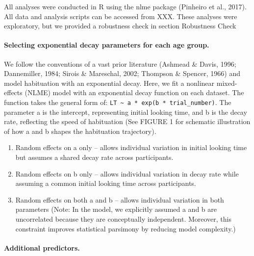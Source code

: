 \documentclass[10pt, letterpaper]{article}
\begin{document}
All analyses were conducted in R using the nlme package (Pinheiro et
al., 2017). All data and analysis scripts can be accessed from XXX.
These analyses were exploratory, but we provided a robustness check in
section Robustness Check

\hypertarget{selecting-exponential-decay-parameters-for-each-age-group.}{%
\paragraph{Selecting exponential decay parameters for each age
group.}\label{selecting-exponential-decay-parameters-for-each-age-group.}}

We follow the conventions of a vast prior literature (Ashmead \& Davis,
1996; Dannemiller, 1984; Sirois \& Mareschal, 2002; Thompson \& Spencer,
1966) and model habituation with an exponential decay. Here, we fit a
nonlinear mixed-effects (NLME) model with an exponential decay function
on each dataset. The function takes the general form of:
\texttt{LT\ \textasciitilde{}\ a\ *\ exp(b\ *\ trial\_number)}. The
parameter a is the intercept, representing initial looking time, and b
is the decay rate, reflecting the speed of habituation (See FIGURE 1 for
schematic illustration of how a and b shapes the habituation
trajectory).

\begin{enumerate}
\def\labelenumi{\arabic{enumi}.}
\item
  Random effects on a only -- allows individual variation in initial
  looking time but assumes a shared decay rate across participants.
\item
  Random effects on b only -- allows individual variation in decay rate
  while assuming a common initial looking time across participants.
\item
  Random effects on both a and b -- allows individual variation in both
  parameters (Note: In the model, we explicitly assumed a and b are
  uncorrelated because they are conceptually independent. Moreover, this
  constraint improves statistical parsimony by reducing model
  complexity.)
\end{enumerate}

\hypertarget{additional-predictors.}{%
\paragraph{Additional predictors.}\label{additional-predictors.}}
\end{document}

